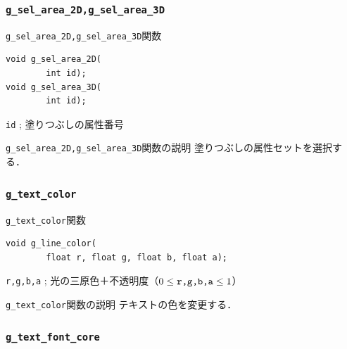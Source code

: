 \documentclass[a4paper,12pt]{jsarticle}%
\begin{document}
\subsubsection{\texttt{g\_sel\_area\_2D,g\_sel\_area\_3D}}

\begin{itembox}[l]{\texttt{g\_sel\_area\_2D,g\_sel\_area\_3D}関数}
\begin{verbatim}
void g_sel_area_2D(
        int id);
void g_sel_area_3D(
        int id);
\end{verbatim}
\verb|id| ; 塗りつぶしの属性番号\\
\end{itembox}

\begin{itembox}[l]{\texttt{g\_sel\_area\_2D,g\_sel\_area\_3D}関数の説明}
塗りつぶしの属性セットを選択する．
\end{itembox}


\clearpage
\subsubsection{\texttt{g\_text\_color}}

\begin{itembox}[l]{\texttt{g\_text\_color}関数}
\begin{verbatim}
void g_line_color(
        float r, float g, float b, float a);
\end{verbatim}
\verb|r,g,b,a| ; 光の三原色＋不透明度（$0\leq \verb|r,g,b,a| \leq 1$）\\
\end{itembox}

\begin{itembox}[l]{\texttt{g\_text\_color}関数の説明}
テキストの色を変更する．
\end{itembox}

\subsubsection{\texttt{g\_text\_font\_core}}
\end{document}
